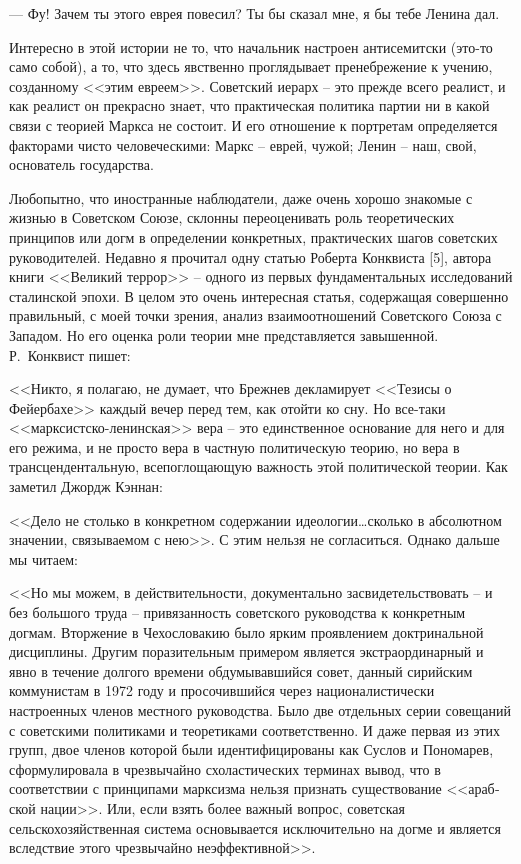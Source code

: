 \documentclass{book}
\begin{document}
--- Фу! Зачем ты этого еврея повесил? Ты бы сказал мне, я бы тебе Ленина дал.

Интересно в этой истории не то, что начальник настроен антисемитски (это-то само собой), а то, что здесь явственно проглядывает пренебрежение к учению, созданному <<этим евреем>>. Советский иерарх -- это прежде всего реалист, и как реалист он прекрасно знает, что практическая политика партии ни в какой связи с теорией Маркса не состоит. И его отношение к портретам определяется факторами чисто человеческими: Маркс -- еврей, чужой; Ленин -- наш, свой, основатель государства.

Любопытно, что иностранные наблюдатели, даже очень хорошо знакомые с жизнью в Советском Союзе, склонны переоценивать роль 
теоретических принципов или догм в определении конкретных, практических шагов советских руководителей. Недавно я прочитал одну 
статью Роберта Конквиста [5], автора книги <<Великий террор>> -- одного из первых фундаментальных исследований сталинской эпохи. 
В целом это очень интересная статья, содержащая совершенно правильный, с моей точки зрения, анализ взаимоотношений Советского 
Союза с Западом. Но его оценка роли теории мне представляется завышенной. Р.~Конквист пишет:

<<Никто, я полагаю, не думает, что Брежнев декламирует <<Тезисы о Фейербахе>> каждый вечер перед тем, как отойти ко сну. Но 
все-таки <<марксистско-ленинская>> вера -- это единственное основание для него и для его режима, и не просто вера в частную 
политическую теорию, но вера в трансцендентальную, всепоглощающую важность этой политической теории. Как заметил Джордж Кэннан: 

<<Дело не столько в конкретном содержании идеологии\ldots сколько в абсолютном значении, связываемом с нею>>. С этим нельзя не согласиться. Однако дальше мы читаем:

<<Но мы можем, в действительности, документально засвидетельствовать -- и без большого труда -- привязанность советского руководства к конкретным догмам. Вторжение в Чехословакию было ярким проявлением доктринальной дисциплины. Другим поразительным примером является экстраординарный и явно в течение долгого времени обдумывавшийся совет, данный сирийским коммунистам в 1972 году и просочившийся через националистически настроенных членов мест­ного руководства. Было две отдельных серии совещаний с советскими политиками и теоретиками соответственно. И даже первая из этих групп, двое членов которой были идентифици­рованы как Суслов и Пономарев, сформулировала в чрезвы­чайно схоластических терминах вывод, что в соответствии с принципами марксизма нельзя признать существование <<араб­ской нации>>. Или, если взять более важный вопрос, советская сельскохозяйственная система основывается исключительно на догме и является вследствие этого чрезвычайно неэффектив­ной>>.
\end{document}
